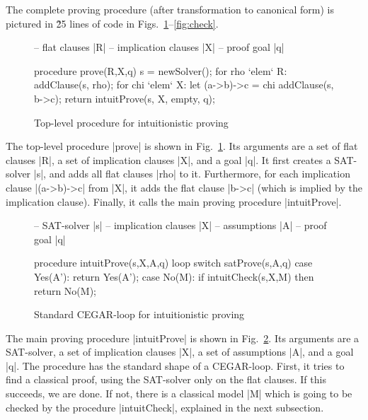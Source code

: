 \documentclass{llncs}
\begin{document}
The complete proving procedure (after transformation to canonical form) is pictured in \~25 lines of code in Figs.\ \ref{fig:top-level}--\ref{fig:check}.

\begin{figure}[t]
\begin{center}
\begin{code}
-- flat clauses |R|
-- implication clauses |X|
-- proof goal |q|

procedure prove(R,X,q)
  s = newSolver();
  for rho `elem` R:
    addClause(s, rho);
  for chi `elem` X:
    let (a->b)->c = chi
    addClause(s, b->c);
  return intuitProve(s, X, empty, q);
\end{code}
\vspace{-0.7cm}\end{center}
\caption{Top-level procedure for intuitionistic proving}
\label{fig:top-level}
\end{figure}

The top-level procedure |prove| is shown in Fig.\ \ref{fig:top-level}. Its arguments are a set of flat clauses |R|, a set of implication clauses |X|, and a goal |q|. It first creates a SAT-solver |s|, and adds all flat clauses |rho| to it. Furthermore, for each implication clause |(a->b)->c| from |X|, it adds the flat clause |b->c| (which is implied by the implication clause). Finally, it calls the main proving procedure |intuitProve|.

\begin{figure}[t]
\begin{center}
\begin{code}
-- SAT-solver |s|
-- implication clauses |X|
-- assumptions |A|
-- proof goal |q|

procedure intuitProve(s,X,A,q)
  loop
    switch satProve(s,A,q)
      case Yes(A'):
        return Yes(A');
      case No(M):
        if intuitCheck(s,X,M) then
          return No(M);
\end{code}
\vspace{-0.7cm}\end{center}
\caption{Standard CEGAR-loop for intuitionistic proving}
\label{fig:intuit}
\end{figure}

The main proving procedure |intuitProve| is shown in Fig.\ \ref{fig:intuit}. Its arguments are a SAT-solver, a set of implication clauses |X|, a set of assumptions |A|, and a goal |q|. The procedure has the standard shape of a CEGAR-loop. First, it tries to find a classical proof, using the SAT-solver only on the flat clauses. If this succeeds, we are done. If not, there is a classical model |M| which is going to be checked by the procedure |intuitCheck|, explained in the next subsection.
\end{document}
